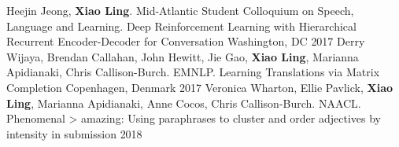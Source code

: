 
\begin{cventries}
  \cventrypublication
    {Heejin Jeong, \textbf{Xiao Ling}.  Mid-Atlantic Student Colloquium on Speech, Language and Learning.}
    {Deep Reinforcement Learning with Hierarchical Recurrent Encoder-Decoder for Conversation}
    {Washington, DC}
    {2017}
    {}
  \cventrypublication
    {Derry Wijaya, Brendan Callahan, John Hewitt, Jie Gao, \textbf{Xiao Ling}, Marianna Apidianaki, Chris Callison-Burch. EMNLP.}
    {Learning Translations via Matrix Completion}
    {Copenhagen, Denmark}
    {2017}
    {}
  \cventrypublication
    {Veronica Wharton, Ellie Pavlick, \textbf{Xiao Ling}, Marianna Apidianaki, Anne Cocos, Chris Callison-Burch. NAACL.}
    {Phenomenal > amazing: Using paraphrases to cluster and order adjectives by intensity}
    {in submission}
    {2018}
    {}
\end{cventries}


